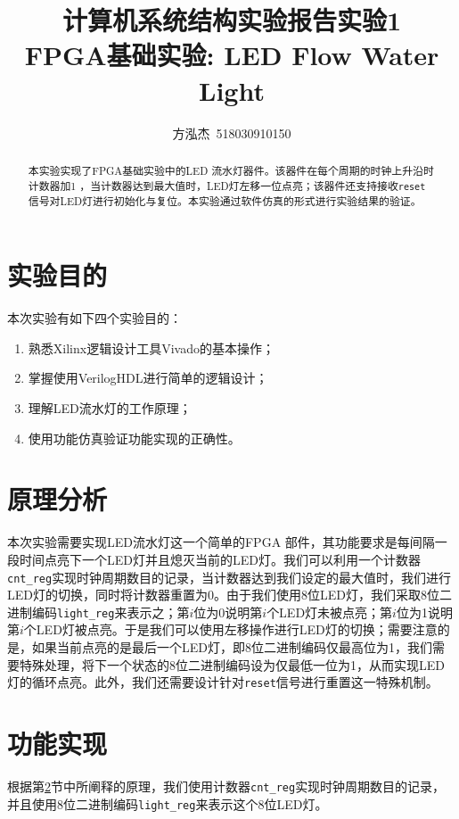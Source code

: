 \documentclass{cumcm}
\title{\textbf{计算机系统结构实验报告\quad 实验1}\\{\Large FPGA基础实验: LED Flow Water Light}}
\author{方泓杰\ 518030910150}
\numberwithin{equation}{section}
\numberwithin{equation}{subsection}
\begin{document}
\maketitle

\begin{abstract}
  本实验实现了FPGA基础实验中的LED 流水灯器件。该器件在每个周期的时钟上升沿时计数器加1 ，当计数器达到最大值时，LED灯左移一位点亮；该器件还支持接收\texttt{reset}信号对LED灯进行初始化与复位。本实验通过软件仿真的形式进行实验结果的验证。
\end{abstract}

\maketitle \tableofcontents
\newpage

\section{实验目的}\label{section1}
本次实验有如下四个实验目的：
\begin{enumerate}
    \item 熟悉Xilinx逻辑设计工具Vivado的基本操作；
    \item 掌握使用VerilogHDL进行简单的逻辑设计；
    \item 理解LED流水灯的工作原理；
    \item 使用功能仿真验证功能实现的正确性。
\end{enumerate}

\section{原理分析}\label{section2}
本次实验需要实现LED流水灯这一个简单的FPGA 部件，其功能要求是每间隔一段时间点亮下一个LED灯并且熄灭当前的LED灯。我们可以利用一个计数器\texttt{cnt\_reg}实现时钟周期数目的记录，当计数器达到我们设定的最大值时，我们进行LED灯的切换，同时将计数器重置为0。由于我们使用8位LED灯，我们采取8位二进制编码\texttt{light\_reg}来表示之；第$i$位为0说明第$i$个LED灯未被点亮；第$i$位为1说明第$i$个LED灯被点亮。于是我们可以使用左移操作进行LED灯的切换；需要注意的是，如果当前点亮的是最后一个LED灯，即8位二进制编码仅最高位为1，我们需要特殊处理，将下一个状态的8位二进制编码设为仅最低一位为1，从而实现LED灯的循环点亮。此外，我们还需要设计针对\texttt{reset}信号进行重置这一特殊机制。

\section{功能实现}\label{section3}
根据第\ref{section2}节中所阐释的原理，我们使用计数器\texttt{cnt\_reg}实现时钟周期数目的记录，并且使用8位二进制编码\texttt{light\_reg}来表示这个8位LED灯。
\end{document}
